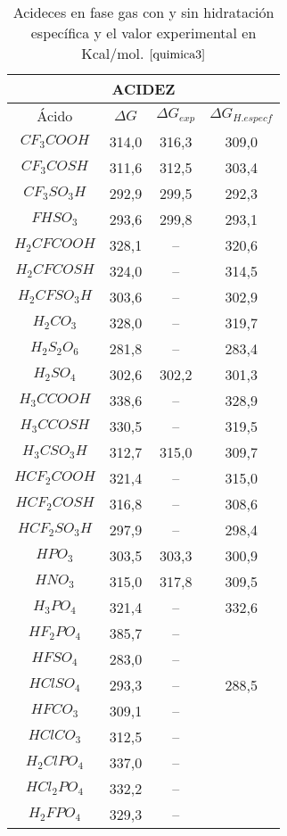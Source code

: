  \begin{table}[H]
     \centering
     \begin{tabular}{|c|c|c|c|}
     \hline
     \multicolumn{4}{|c|}{\bfseries{ACIDEZ}} \\ \hline
     Ácido & $\Delta G$ & $\Delta G_{exp}$ & $\Delta G_{ H. especf}$ \\ \hline
$CF_3COOH$ & 314,0 & 316,3 & 309,0\\ \hline
$CF_3COSH$ & 311,6 & 312,5 & 303,4\\ \hline
$CF_3SO_3H$ & 292,9 & 299,5 &292,3\\ \hline
$FHSO_3$ & 293,6 & 299,8 & 293,1\\ \hline
$H_2CFCOOH$ & 328,1 &-- & 320,6\\ \hline
$H_2CFCOSH$ & 324,0 & --& 314,5\\ \hline
$H_2CFSO_3H$ & 303,6 & -- & 302,9\\ \hline
$H_2CO_3$ & 328,0	& -- & 319,7\\ \hline
$H_2S_2O_6$ & 281,8 & -- & 283,4\\ \hline
$H_2SO_4$ & 302,6	& 302,2 & 301,3\\ \hline
$H_3CCOOH$ & 338,6 & -- &	328,9\\ \hline
$H_3CCOSH$ & 330,5 & -- &	319,5\\ \hline
$H_3CSO_3H$ & 312,7 & 315,0 & 309,7\\ \hline
$HCF_2COOH$ & 	321,4 & -- & 315,0\\ \hline
$HCF_2COSH$ & 	316,8 & -- & 308,6\\ \hline
$HCF_2SO_3H$ & 	297,9 & -- & 298,4\\ \hline
$HPO_3$ & 303,5 & 303,3 & 300,9\\ \hline
$HNO_3$ & 315,0 & 317,8 & 309,5\\ \hline
$H_3PO_4$ & 321,4	& -- & 332,6 \\ \hline
$HF_2PO_4$ & 385,7 & -- &  \\ \hline
$HFSO_4$ & 283,0 & -- &\\ \hline
$HClSO_4$ & 293,3 & -- & 288,5\\ \hline
$HFCO_3$ & 309,1 & -- &\\ \hline
$HClCO_3$ & 312,5 & -- &\\ \hline
$H_2ClPO_4$ & 337,0 & -- &\\ \hline
$HCl_2PO_4$ & 332,2 & -- &\\ \hline
$H_2FPO_4$ & 329,3 & -- &\\ \hline
     \end{tabular}
     \caption{Acideces en fase gas con y sin hidratación específica y el valor experimental en Kcal/mol. $\cite{quimica3}$ }
     \label{tab:3.8}
 \end{table}

